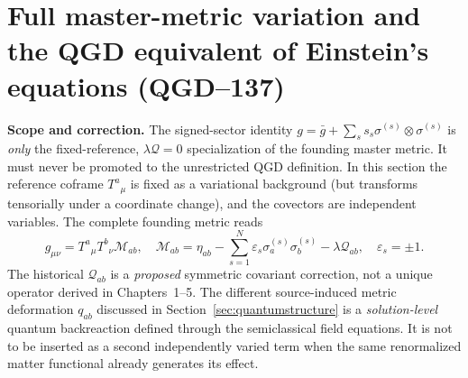 \documentclass[11pt,a4paper]{article}
\begin{document}
\section{Full master-metric variation and the QGD equivalent of Einstein's equations (QGD--137)}
\label{sec:qgd137-fullvary}
\textbf{Scope and correction.} The signed-sector identity
$g=\bar g+\sum_s s_s\sigma^{(s)}\otimes\sigma^{(s)}$
is \emph{only} the fixed-reference, $\lambda\mathcal Q=0$ specialization
of the founding master metric. It must never be promoted to the unrestricted
QGD definition. In this section the reference coframe $T^a{}_{\mu}$ is fixed
as a variational background (but transforms tensorially under a coordinate
change), and the covectors are independent variables. The complete founding
metric reads
\begin{equation}\label{eq:qgd137-master}
\boxed{g_{\mu\nu}=T^a{}_{\mu}T^b{}_{\nu}
\mathcal M_{ab},\quad
\mathcal M_{ab}=\eta_{ab}-\sum_{s=1}^N\varepsilon_s
\sigma_a^{(s)}\sigma_b^{(s)}-\lambda\mathcal Q_{ab},
\quad \varepsilon_s=\pm1.}
\end{equation}
The historical $\mathcal Q_{ab}$ is a \emph{proposed} symmetric
covariant correction, not a unique operator derived in Chapters~1--5.
The different source-induced metric deformation $q_{ab}$ discussed in
Section~\ref{sec:quantumstructure} is a \emph{solution-level} quantum
backreaction defined through the semiclassical field equations. It is
not to be inserted as a second independently varied term when the
same renormalized matter functional already generates its effect.
\end{document}
